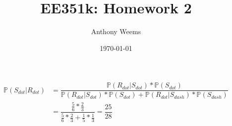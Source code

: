 \documentclass{article}
\begin{document}
\title{EE351k: Homework 2}
\author{Anthony Weems}
\date{\today}
\maketitle

\subsection{}

\begin{align*}
    \mathbb{P}(S_{dot}|R_{dot}) &= \dfrac{\mathbb{P}(R_{dot}|S_{dot}) * \mathbb{P}(S_{dot})}{\mathbb{P}(R_{dot}|S_{dot}) * \mathbb{P}(S_{dot}) + \mathbb{P}(R_{dot}|S_{dash}) * \mathbb{P}(S_{dash})} \\
    &=\dfrac{\frac{5}{6} * \frac{2}{3}}{\frac{5}{6} * \frac{2}{3} + \frac{1}{5} * \frac{1}{3}} =\dfrac{25}{28}
\end{align*}

\subsection{}
\end{document}
